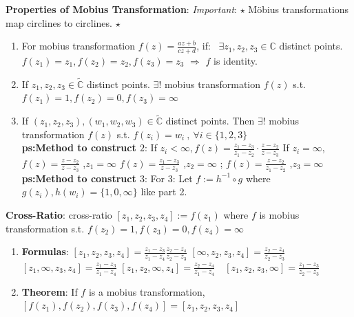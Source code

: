 \documentclass[9pt]{article}
\begin{document}
\textbf{Properties of Mobius Transformation}: \textit{Important}: $\star$ Möbius transformations map circlines to circlines. $\star$
\begin{enumerate}[itemsep=-2pt, topsep=-2pt]
    \item For mobius transformation $f(z)=\frac{az+b}{cz+d}$, if: \ $\exists z_1,z_2,z_3\in\mathbb{C}$ distinct points. $f(z_1)=z_1,f(z_2)=z_2,f(z_3)=z_3$ $\Rightarrow$ $f$ is identity.
    \item If $z_1,z_2,z_3\in\widetilde{\mathbb{C}}$ distinct points. \quad $\exists!$ mobius transformation $f(z)$ s.t. $f(z_1)=1,f(z_2)=0,f(z_3)=\infty$
    \item If $(z_1,z_2,z_3),(w_1,w_2,w_3)\in\widetilde{\mathbb{C}}$ distinct points. Then $\exists!$ mobius transformation $f(z)$ s.t. $f(z_i)=w_i \ , \ \forall i\in\{1,2,3\}$ \\
    \textbf{ps:Method to construct $2$}: If $z_i<\infty,f(z)=\frac{z_1-z_3}{z_1-z_2}\cdot\frac{z-z_2}{z-z_3}$ \qquad If $z_i=\infty$, {\footnotesize $f(z)=\frac{z-z_2}{z-z_3}$ {\scriptsize ,$z_1=\infty$} $f(z)=\frac{z_1-z_3}{z-z_3}$ {\scriptsize ,$z_2=\infty$} ; $f(z)=\frac{z-z_2}{z_1-z_2}$ {\scriptsize ,$z_3=\infty$} } \\
    \textbf{ps:Method to construct $3$}: For 3: Let $f:=h^{-1}\circ g$ {\footnotesize where $g(z_i),h(w_i)=\{1,0,\infty\}$ like part 2.}
    \vspace{1.5pt}
\end{enumerate}

\textbf{Cross-Ratio}: cross-ratio $[z_1,z_2,z_3,z_4]:=f(z_1)$ where $f$ is mobius transformation s.t. $f(z_2)=1,f(z_3)=0,f(z_4)=\infty$

\begin{enumerate}[itemsep=-2pt, topsep=-2pt]
    \item \textbf{Formulas}: {\footnotesize $[z_1,z_2,z_3,z_4]=\frac{z_1-z_3}{z_1-z_4}\frac{z_2-z_4}{z_2-z_3}$ \quad $[\infty,z_2,z_3,z_4]=\frac{z_2-z_4}{z_2-z_3}$ \quad $[z_1,\infty,z_3,z_4]=\frac{z_1-z_3}{z_1-z_4}$ \quad $[z_1,z_2,\infty,z_4]=\frac{z_2-z_4}{z_1-z_4} \quad [z_1,z_2,z_3,\infty]=\frac{z_1-z_3}{z_2-z_3}$}
    \item \textbf{Theorem}: If $f$ is a mobius transformation, $[f(z_1),f(z_2),f(z_3),f(z_4)]=[z_1,z_2,z_3,z_4]$ \qquad {}
\end{enumerate}
\end{document}
